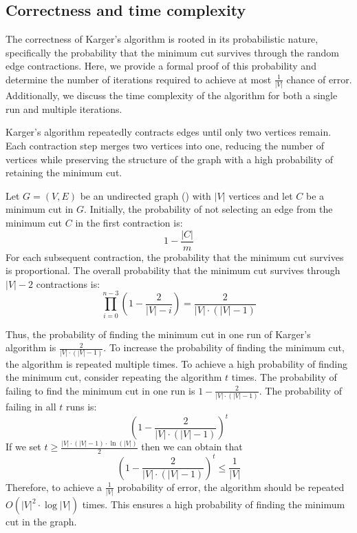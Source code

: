 \subsection{Correctness and time complexity}
    
    The correctness of Karger's algorithm is rooted in its probabilistic nature, specifically the probability that the minimum cut survives through the random edge contractions. Here, we provide a formal proof of this probability and determine the number of iterations required to achieve at most \( \frac{1}{|V|} \) chance of error. Additionally, we discuss the time complexity of the algorithm for both a single run and multiple iterations.

    Karger's algorithm repeatedly contracts edges until only two vertices remain. Each contraction step merges two vertices into one, reducing the number of vertices while preserving the structure of the graph with a high probability of retaining the minimum cut.

    Let \( G = (V, E) \) be an undirected graph () with \( |V| \) vertices and let \( C \) be a minimum cut in \( G \). Initially, the probability of not selecting an edge from the minimum cut \( C \) in the first contraction is:
    \[
    1 - \frac{|C|}{m}
    \]
    For each subsequent contraction, the probability that the minimum cut survives is proportional. The overall probability that the minimum cut survives through \( |V| - 2 \) contractions is:
    \[
    \prod_{i=0}^{n-3} \left( 1 - \frac{2}{ |V| - i} \right) = \frac{2}{|V| \cdot (|V| - 1)}
    \]

    Thus, the probability of finding the minimum cut in one run of Karger's algorithm is \( \frac{2}{|V| \cdot (|V| - 1)} \). To increase the probability of finding the minimum cut, the algorithm is repeated multiple times. To achieve a high probability of finding the minimum cut, consider repeating the algorithm \( t \) times. The probability of failing to find the minimum cut in one run is \( 1 - \frac{2}{|V| \cdot (|V| - 1)} \). The probability of failing in all \( t \) runs is:
    \[
    \left(1 - \frac{2}{|V| \cdot (|V| - 1)}\right)^t
    \]
    If we set \( t \geq \frac{|V| \cdot (|V| - 1) \cdot \ln(|V|)}{2} \) then we can obtain that
    \[ \left(1 - \frac{2}{|V| \cdot (|V| - 1)}\right)^t  \leq \frac{1}{|V|}\]
    Therefore, to achieve a \( \frac{1}{|V|} \) probability of error, the algorithm should be repeated \( O(|V|^2 \cdot \log |V|) \) times. This ensures a high probability of finding the minimum cut in the graph.

